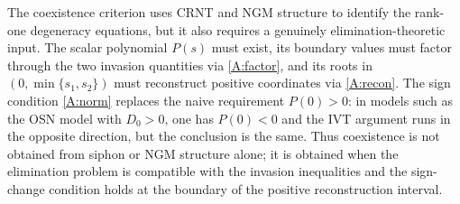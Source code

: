 The coexistence criterion uses CRNT and NGM structure to identify the
rank-one degeneracy equations, but it also requires a genuinely
elimination-theoretic input.  The scalar polynomial $P(s)$ must exist,
its boundary values must factor through the two invasion quantities via
\ref{A:factor}, and its roots in $(0,\min\{s_1,s_2\})$ must
reconstruct positive coordinates via \ref{A:recon}.  The sign
condition \ref{A:norm} replaces the naive requirement $P(0)>0$: in
models such as the OSN model with $D_0>0$, one has $P(0)<0$ and the
IVT argument runs in the opposite direction, but the conclusion is
the same.  Thus coexistence is not obtained from siphon or NGM
structure alone; it is obtained when the elimination problem is
compatible with the invasion inequalities and the sign-change condition
holds at the boundary of the positive reconstruction interval.
\eeR